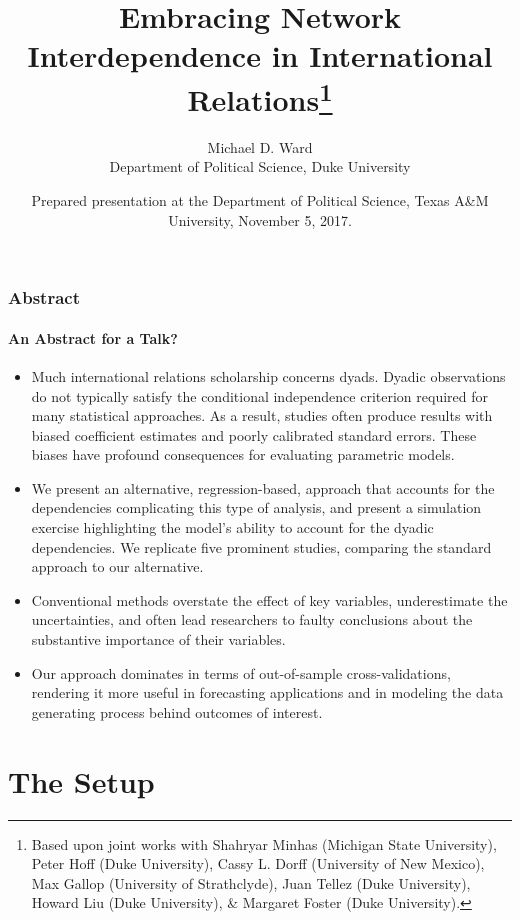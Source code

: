 \documentclass[10pt,xcolor=dvipsnames,compress]{beamer}
\title[AMEN]{Embracing Network Interdependence in International Relations\thanks{Based upon joint works with Shahryar Minhas (Michigan State University), Peter Hoff (Duke University), Cassy L. Dorff (University of New Mexico), Max Gallop (University of Strathclyde), Juan Tellez (Duke University), Howard Liu (Duke University), \& Margaret Foster (Duke University).}
}
\author 
{Michael D. Ward\\ 
Department of Political Science, Duke University}
\date{Prepared presentation at the Department of Political Science, Texas A\&M University, November 5, 2017. }
\begin{document}
\frame{\titlepage}


\begin{frame}
\frametitle{Abstract}
\framesubtitle{An Abstract for a Talk?}
\begin{itemize}
\item Much international relations scholarship concerns dyads. Dyadic observations do not typically satisfy the conditional independence criterion required for many statistical approaches. As a result, studies often produce results with biased coefficient estimates and poorly calibrated standard errors. These biases have profound consequences for evaluating parametric models. 

\item We present an alternative, regression-based, approach that accounts for the dependencies complicating this type of analysis, and present a simulation exercise highlighting the model's ability to account for the dyadic dependencies. We replicate five prominent studies, comparing the standard approach to our alternative. 

\item Conventional methods overstate the effect of key variables, underestimate the uncertainties, and often lead researchers to faulty conclusions about the substantive importance of their variables. 

\item Our approach dominates in terms of out-of-sample cross-validations, rendering it more useful in forecasting applications and in modeling the data generating process behind outcomes of interest.
\end{itemize}
\end{frame}

\section{The Setup}
\end{document}
